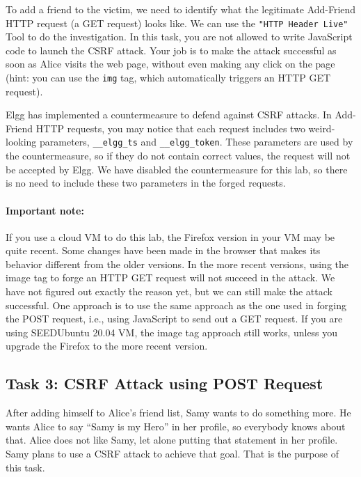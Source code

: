 To add a friend to the victim, we need to identify what the legitimate 
Add-Friend HTTP request (a GET request) looks like. We can use 
the \texttt{"HTTP Header Live"} Tool to do the investigation. 
In this task, you are not allowed to
write JavaScript code to launch the CSRF attack. Your job is to make the
attack successful as soon as Alice visits the web page, without even making
any click on the page (hint: you can use the {\tt img} tag, which
automatically triggers an HTTP GET request).
 

Elgg has implemented a countermeasure to defend against 
CSRF attacks. In Add-Friend HTTP requests, you may notice that each 
request includes two weird-looking parameters, \texttt{\_\_elgg\_ts} and 
\texttt{\_\_elgg\_token}. These parameters are used by the countermeasure, so if they do not
contain correct values, the request will not be accepted by Elgg.   
We have disabled the countermeasure for this lab, so there is no need to include these two 
parameters in the forged requests. 


\paragraph{Important note:} If you use a cloud VM to do this lab, the Firefox version
in your VM may be quite recent. Some changes have been made in the browser that makes its
behavior different from the older versions. In the more recent versions, 
using the image tag to forge an HTTP GET request will not succeed in the 
attack.  We have not figured out exactly the reason yet, 
but we can still make the attack successful. One approach is to 
use the same approach as the one used in forging the POST request, i.e.,
using JavaScript to send out a GET request.
If you are using SEEDUbuntu 20.04 VM, the image tag approach still works, 
unless you upgrade the Firefox to the more recent version. 

\subsection{Task 3: CSRF Attack using POST Request}

After adding himself to Alice's friend list, Samy wants to do something more. He 
wants Alice to say ``Samy is my Hero'' in her profile, so everybody knows 
about that. Alice does not like Samy, let alone putting that statement 
in her profile. Samy plans to use a CSRF attack to achieve that goal. 
That is the purpose of this task. 


